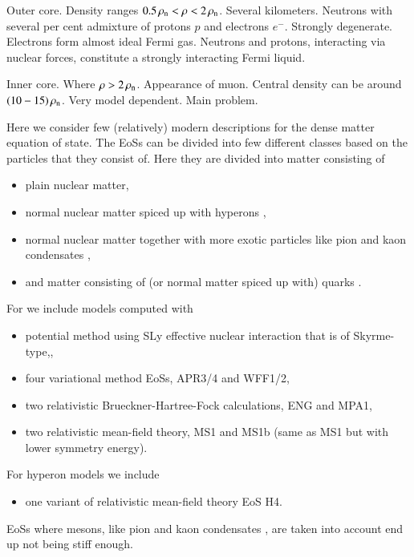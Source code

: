 Outer core.
Density ranges $0.5 \, \rho_{\mathrm{n}}  < \rho < 2\, \rho_{\mathrm{n}} $.
Several kilometers.
Neutrons with several per cent admixture of protons $p$ and electrons $e^{-}$.
Strongly degenerate.
Electrons form almost ideal Fermi gas.
Neutrons and protons, interacting via nuclear forces, constitute a strongly interacting Fermi liquid.

Inner core.
Where $\rho > 2\, \rho_{\mathrm{n}} $.
Appearance of muon.
Central density can be around $(10-15)\, \rho_{\mathrm{n}} $.
Very model dependent.
Main problem.

Here we consider few (relatively) modern descriptions for the dense matter equation of state.
The EoSs can be divided into few different classes based on the particles that they consist of.
Here they are divided into matter consisting of
\begin{itemize}
    \item plain \npem nuclear matter, 
    \item normal nuclear matter spiced up with hyperons \hyperon,
    \item normal nuclear matter together with more exotic particles like pion and kaon condensates \pikaon,
    \item and matter consisting of (or normal matter spiced up with) quarks \quark.
\end{itemize}

For \npem we include models computed with
\begin{itemize}
    \item potential method using SLy effective nuclear interaction that is of Skyrme-type,\cite{SLy},
    \item four variational method EoSs, APR3/4\cite{APR} and WFF1/2\cite{WFF},
    \item two relativistic Brueckner-Hartree-Fock calculations, ENG\cite{ENG} and MPA1\cite{MPA},
    \item two relativistic mean-field theory, MS1 and MS1b (same as MS1 but with lower symmetry energy)\cite{MS}.
\end{itemize}

For hyperon models \hyperon we include
\begin{itemize}
    \item one variant of relativistic mean-field theory EoS H4\cite{H4}.
\end{itemize}

EoSs where mesons, like pion and kaon condensates \pikaon, are taken into account end up not being stiff enough.

